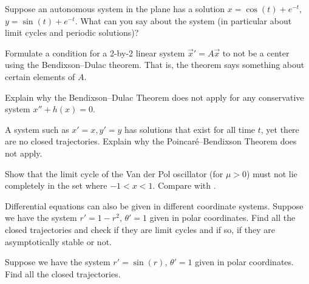 \documentclass{ximera}
\begin{document}
\begin{exercise}%
    Suppose an autonomous system in the plane has a solution $x=\cos(t)+e^{-t}$, $y=\sin(t)+e^{-t}$.  What can you say about the system (in particular about limit cycles and periodic solutions)?
\end{exercise}

\begin{exercise}
    Formulate a condition for a 2-by-2 linear system ${\vec{x}}' = A \vec{x}$ to not be a center using the Bendixson--Dulac theorem. That is, the theorem says something about certain elements of $A$.
\end{exercise}

\begin{exercise}
Explain why the Bendixson--Dulac Theorem does not apply for any conservative system $x''+h(x) = 0$.
\end{exercise}

\begin{exercise}
    A system such as $x'=x, y'=y$ has solutions that exist for all time $t$, yet there are no closed trajectories.  Explain why the Poincar\'e--Bendixson Theorem does not apply.
\end{exercise}

\begin{exercise}%
    Show that the limit cycle of the  Van der Pol oscillator (for $\mu > 0$) must not lie completely in the set where $-1 < x < 1$. Compare with .
\end{exercise}

\begin{exercise}
    Differential equations can also be given in different coordinate systems. Suppose we have the system $r' = 1-r^2$, $\theta' = 1$ given in polar coordinates.  Find all the closed trajectories and check if they are limit cycles and if so, if they are asymptotically stable or not. 
\end{exercise}

\begin{exercise}%
    Suppose we have the system $r' = \sin(r)$, $\theta' = 1$ given in polar coordinates.  Find all the closed trajectories.
\end{exercise}


%
\end{document}
